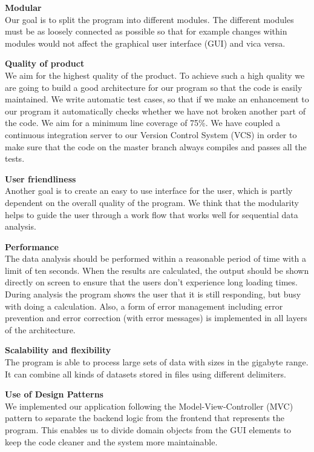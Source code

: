 \documentclass[a4paper,english,fleqn]{exam}
\begin{document}
\textbf{Modular}\\
Our goal is to split the program into different modules. The different modules must be as loosely connected as possible so that for example changes within modules would not affect the graphical user interface (GUI) and vica versa.


\textbf{Quality of product}\\
We aim for the highest quality of the product. To achieve such a high quality we are going to build a good architecture for our program so that the code is easily maintained. We write automatic test cases, so that if we make an enhancement to our program it automatically checks whether we have not broken another part of the code. We aim for a minimum line coverage of 75\%. We have coupled a continuous integration server to our Version Control System (VCS) in order to make sure that the code on the master branch always compiles and passes all the tests.


\textbf{User friendliness}\\
Another goal is to create an easy to use interface for the user, which is partly dependent on the overall quality of the program. We think that the modularity helps to guide the user through a work flow that works well for sequential data analysis.


\textbf{Performance} \\
The data analysis should be performed within a reasonable period of time with a limit of ten seconds. When the results are calculated, the output should be shown directly on screen to ensure that the users don't experience long loading times. During analysis the program shows the user that it is still responding, but busy with doing a calculation. Also, a form of error management including error prevention and error correction (with error messages) is implemented in all layers of the architecture.

\textbf{Scalability and flexibility}\\
The program is able to process large sets of data with sizes in the gigabyte range. It can combine all kinds of datasets stored in files using different delimiters.

\textbf{Use of Design Patterns} \\
We implemented our application following the Model-View-Controller (MVC) pattern to separate the backend logic from the frontend that represents the program. This enables us to divide domain objects from the GUI elements to keep the code cleaner and the system more maintainable.
\end{document}
